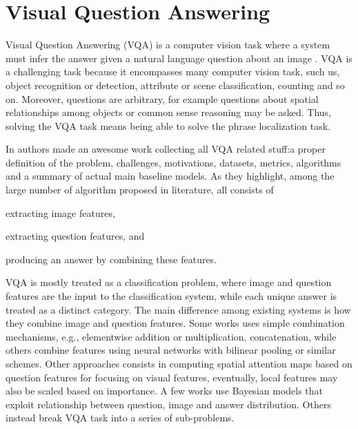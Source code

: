 \section{Visual Question Answering}

Visual Question Answering (VQA) is a computer vision task where a
system must infer the answer given a natural language question about
an image \cite{kafle2017visual}. VQA is a challenging task because it
encompasses many computer vision task, such us, object recognition or
detection, attribute or scene classification, counting and so on.
Moreover, questions are arbitrary, for example questions about spatial
relationships among objects or common sense reasoning may be asked.
Thus, solving the VQA task means being able to solve the phrase
localization task.

In \cite{kafle2017visual} authors made an awesome work collecting all
VQA related stuff:a proper definition of the problem, challenges,
motivations, datasets, metrics, algorithms and a summary of actual
main baseline models. As they highlight, among the large number of
algorithm proposed in literature, all consists of
\begin{enumerate*}[label=(\roman*)] 
  \item extracting image features,
  \item extracting question features, and
  \item producing an answer by combining these features.
\end{enumerate*}
VQA is mostly treated as a classification problem, where image and
question features are the input to the classification system, while
each unique answer is treated as a distinct category. The main
difference among existing systems is how they combine image and
question features. Some works uses simple combination mechanisms,
e.g., elementwise addition or multiplication, concatenation, while
others combine features using neural networks with bilinear pooling or
similar schemes. Other approaches consists in computing spatial
attention maps based on question features for focusing on visual
features, eventually, local features may also be scaled based on
importance. A few works use Bayesian models that exploit relationship
between question, image and answer distribution. Others instead break
VQA task into a series of sub-problems.
